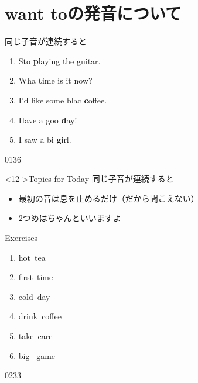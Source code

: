 \documentclass[aspectratio=169,xcolor={dvipsnames,table}]{beamer}
\begin{document}
\section{want toの発音について}
\begin{frame}[plain]{同じ子音が連続すると}
\large
 \begin{enumerate}
  \item<2-> Sto  \textbf{p}laying the guitar.
  \item<4-> Wha  \textbf{t}ime is it now?
  \item<6-> I'd like some blac  \textbf{c}offee.
  \item<8-> Have a goo  \textbf{d}ay!
  \item<10-> I saw a bi  \textbf{g}irl.
 \end{enumerate}
\hfill{\tiny 0136}\,{\scriptsize {}}

\begin{block}<12->{Topics for Today}\small
同じ子音が連続すると
\begin{itemize}[square]\small
 \item 最初の音は息を止めるだけ（だから聞こえない）
 \item 2つめはちゃんといいますよ
\end{itemize}

\end{block}
\end{frame}
\begin{frame}[plain]{Exercises}
\Large
 \begin{enumerate}
  \item hot\textcolor{Maroon}{\textbottomtiebar\ }tea
  \item first\textcolor{Maroon}{\textbottomtiebar\ }time
  \item cold\textcolor{Maroon}{\textbottomtiebar\ }day
  \item drink\textcolor{Maroon}{\textbottomtiebar\ }coffee
  \item take\textcolor{Maroon}{\textbottomtiebar\ }care
  \item big\textcolor{Maroon}{\textbottomtiebar\ } game
 \end{enumerate}

\hfill{\tiny 0233}\,{\scriptsize {}}

\end{frame}
\end{document}
